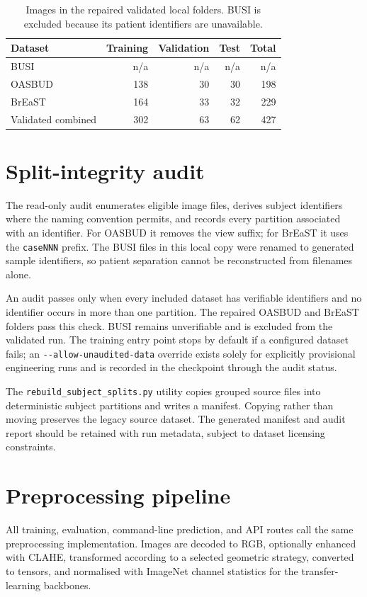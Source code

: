 \begin{table}[htbp]
\centering
\caption{Images in the repaired validated local folders. BUSI is excluded because its patient identifiers are unavailable.}
\label{tab:local_counts}
\begin{tabular}{@{}lrrrr@{}}
\toprule
\textbf{Dataset} & \textbf{Training} & \textbf{Validation} & \textbf{Test} & \textbf{Total} \\ \midrule
BUSI & n/a & n/a & n/a & n/a \\
OASBUD & 138 & 30 & 30 & 198 \\
BrEaST & 164 & 33 & 32 & 229 \\ \midrule
Validated combined & 302 & 63 & 62 & 427 \\ \bottomrule
\end{tabular}
\end{table}

\section{Split-integrity audit}
The read-only audit enumerates eligible image files, derives subject identifiers where the naming convention permits, and records every partition associated with an identifier. For OASBUD it removes the view suffix; for BrEaST it uses the \texttt{caseNNN} prefix. The BUSI files in this local copy were renamed to generated sample identifiers, so patient separation cannot be reconstructed from filenames alone.

An audit passes only when every included dataset has verifiable identifiers and no identifier occurs in more than one partition. The repaired OASBUD and BrEaST folders pass this check. BUSI remains unverifiable and is excluded from the validated run. The training entry point stops by default if a configured dataset fails; an \texttt{-{}-allow-unaudited-data} override exists solely for explicitly provisional engineering runs and is recorded in the checkpoint through the audit status.

The \texttt{rebuild\_subject\_splits.py} utility copies grouped source files into deterministic subject partitions and writes a manifest. Copying rather than moving preserves the legacy source dataset. The generated manifest and audit report should be retained with run metadata, subject to dataset licensing constraints.

\section{Preprocessing pipeline}
All training, evaluation, command-line prediction, and API routes call the same preprocessing implementation. Images are decoded to RGB, optionally enhanced with CLAHE, transformed according to a selected geometric strategy, converted to tensors, and normalised with ImageNet channel statistics for the transfer-learning backbones.

